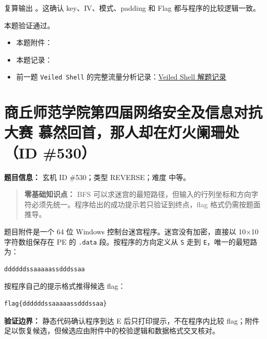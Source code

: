 复算输出 \texttt{}。这确认 key、IV、模式、padding 和 Flag 都与程序的比较逻辑一致。

本题验证通过。

\begin{itemize}
\tightlist
\item
  本题附件：\texttt{}
\item
  本题记录：\texttt{}
\item
  前一题 \texttt{Veiled\ Shell} 的完整流量分析记录：\href{C:/Users/mzj/Desktop/CTF/Veiled\%20Shell-解题记录.md}{Veiled Shell 解题记录}
\end{itemize}

\section{商丘师范学院第四届网络安全及信息对抗大赛 慕然回首，那人却在灯火阑珊处（ID \#530）}\label{ux5546ux4e18ux5e08ux8303ux5b66ux9662ux7b2cux56dbux5c4aux7f51ux7edcux5b89ux5168ux53caux4fe1ux606fux5bf9ux6297ux5927ux8d5b-ux6155ux7136ux56deux9996ux90a3ux4ebaux5374ux5728ux706fux706bux9611ux73caux5904id-530}

\textbf{题目信息：} 玄机 ID \#530；类型 REVERSE；难度 中等。

\begin{quote}
\textbf{零基础知识点：} BFS 可以求迷宫的最短路径，但输入的行列坐标和方向字符必须先统一。程序给出的成功提示若只验证到终点，flag 格式仍需按题面推导。
\end{quote}

题目附件是一个 64 位 Windows 控制台迷宫程序。迷宫没有加密，直接以 10×10 字符数组保存在 PE 的 \texttt{.data} 段。按程序的方向定义从 \texttt{S} 走到 \texttt{E}，唯一的最短路为：

\begin{verbatim}
ddddddssaaaaassdddssaa
\end{verbatim}

按程序自己的提示格式推得候选 flag：

\begin{verbatim}
flag{ddddddssaaaaassdddssaa}
\end{verbatim}

\textbf{验证边界：} 静态代码确认程序到达 E 后只打印提示，不在程序内比较 flag；附件足以恢复候选，但候选应由附件中的校验逻辑和数据格式交叉核对。

